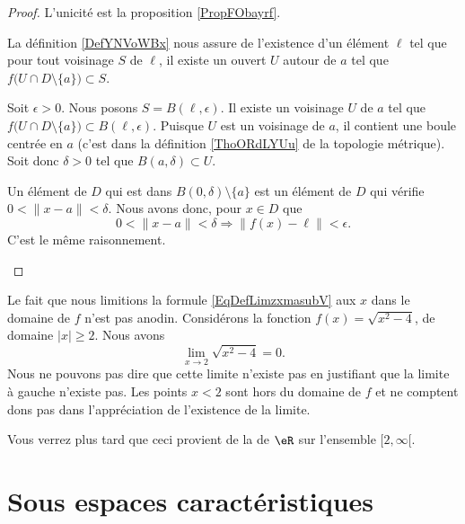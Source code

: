 \begin{proof}
	L'unicité est la proposition \ref{PropFObayrf}.

	\begin{subproof}
		\spitem[\( \Rightarrow\)]
		La définition \ref{DefYNVoWBx} nous assure de l'existence d'un élément \( \ell\) tel que pour tout voisinage \( S\) de \( \ell\), il existe un ouvert \( U\) autour de \( a\) tel que \( f\big( U\cap D\setminus\{ a \} \big)\subset S\).

		Soit \( \epsilon>0\). Nous posons \( S=B(\ell,\epsilon)\). Il existe un voisinage \( U\) de \( a\) tel que \( f\big( U\cap D\setminus\{ a \} \big)\subset B(\ell,\epsilon)\). Puisque \( U\) est un voisinage de \( a\), il contient une boule centrée en \( a\) (c'est dans la définition \ref{ThoORdLYUu} de la topologie métrique). Soit donc \( \delta>0\) tel que \( B(a,\delta)\subset U\).

		Un élément de \( D\) qui est dans \( B(0,\delta)\setminus \{ a \}\) est un élément de \( D\) qui vérifie \( 0<\| x-a \|<\delta\). Nous avons donc, pour \( x\in D\) que
		\begin{equation}
			0<\| x-a \|<\delta\Rightarrow \| f(x)-\ell \|<\epsilon.
		\end{equation}
		\spitem[\( \Leftarrow\)] C'est le même raisonnement.
	\end{subproof}
\end{proof}


\begin{remark}
	Le fait que nous limitions la formule \eqref{EqDefLimzxmasubV} aux \( x\) dans le domaine de \( f\) n'est pas anodin. Considérons la fonction \( f(x)=\sqrt{x^2-4}\), de domaine \( | x |\geq 2\). Nous avons
	\begin{equation}
		\lim_{x\to 2} \sqrt{x^2-4}=0.
	\end{equation}
	Nous ne pouvons pas dire que cette limite n'existe pas en justifiant que la limite à gauche n'existe pas. Les points \( x<2\) sont hors du domaine de \( f\) et ne comptent dons pas dans l'appréciation de l'existence de la limite.

	Vous verrez plus tard que ceci provient de la  de \( \eR\) sur l'ensemble \( \mathopen[ 2 , \infty [\).
\end{remark}

\section{Sous espaces caractéristiques}


